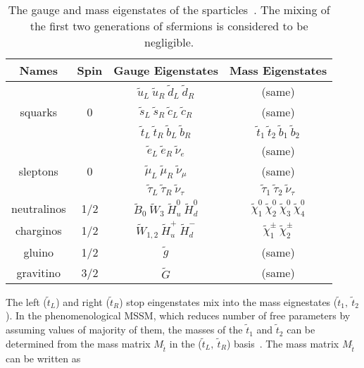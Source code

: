 \begin{table}[h]
\begin{center}
\begin{tabular}{|c|c|c|c|}
\hline
Names & Spin  & Gauge Eigenstates & Mass Eigenstates  \\
\hline
        &   & $\tilde{u}_{L}~\tilde{u}_{R}~\tilde{d}_{L}~\tilde{d}_{R}$  & (same) \\
squarks & 0 & $\tilde{s}_{L}~\tilde{s}_{R}~\tilde{c}_{L}~\tilde{c}_{R}$  & (same) \\
        &   & $\tilde{t}_{L}~\tilde{t}_{R}~\tilde{b}_{L}~\tilde{b}_{R}$  & $\tilde{t}_{1}~\tilde{t}_{2}~\tilde{b}_{1}~\tilde{b}_{2}$ \\
\hline
         &   & $\tilde{e}_{L}~\tilde{e}_{R}~\tilde{\nu}_{e}$  & (same) \\
sleptons & 0 & $\tilde{\mu}_{L}~\tilde{\mu}_{R}~\tilde{\nu}_{\mu}$  & (same) \\
         &   & $\tilde{\tau}_{L}~\tilde{\tau}_{R}~\tilde{\nu}_{\tau}$  & $\tilde{\tau}_{1}~\tilde{\tau}_{2}~\tilde{\nu}_{\tau}$ \\
\hline
neutralinos & 1/2 & $\tilde{B}_{0}~\tilde{W}_{3}~\tilde{H}_{u}^{0}~\tilde{H}_{d}^{0}$  & $\tilde{\chi}_{1}^{0}~\tilde{\chi}_{2}^{0}~\tilde{\chi}_{3}^{0}~\tilde{\chi}_{4}^{0} $ \\
\hline
charginos & 1/2 & $\tilde{W}_{1,2}~\tilde{H}_{u}^{+}~\tilde{H}_{d}^{-}$  & $\tilde{\chi}_{1}^{\pm}~\tilde{\chi}_{2}^{\pm} $ \\
\hline
gluino & 1/2 & $\tilde{g}$  & (same) \\
\hline
gravitino & 3/2 & $\tilde{G}$  & (same) \\
\hline
\end{tabular}
\caption[Table caption text]{The gauge and mass eigenstates of the sparticles~\cite{Martin:1997ns}. The mixing of the first two generations of sfermions is considered to be negligible. }
\label{tab:SUSYspectrum}
\end{center}
\end{table}

The left ($\tilde{t}_{L}$) and right ($\tilde{t}_{R}$) stop eingenstates mix into the mass eignestates ($\tilde{t}_{1},~\tilde{t}_{2}$). In the phenomenological MSSM, which reduces number of free parameters by assuming values of majority of them, the masses of the $\tilde{t}_{1}$ and $\tilde{t}_{2}$ can be determined from the mass matrix $M_{\tilde{t}}$ in the ($\tilde{t}_{L},~\tilde{t}_{R}$) basis~\cite{Passehr:2017ufr}. The mass matrix $M_{\tilde{t}}$ can be written as

